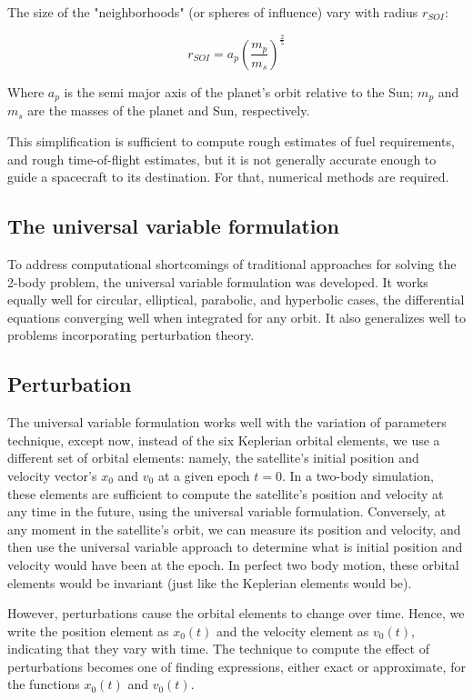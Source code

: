 \documentclass[12pt]{article}
\begin{document}
The size of the "neighborhoods" (or spheres of influence) vary with radius
\(r_{SOI}\):

\[r_{SOI} = a_p{\left(\frac{m_p}{m_s}\right)}^{\frac{2}{5}}\]

Where \(a_p\) is the semi major axis of the planet's orbit relative to the Sun;
\(m_p\) and \(m_s\) are the masses of the planet and Sun, respectively.

This simplification is sufficient to compute rough estimates of fuel
requirements, and rough time-of-flight estimates, but it is not generally
accurate enough to guide a spacecraft to its destination. For that, numerical
methods are required.

\subsection{The universal variable formulation}

To address computational shortcomings of traditional approaches for solving the
2-body problem, the universal variable formulation was developed. It works
equally well for circular, elliptical, parabolic, and hyperbolic cases, the
differential equations converging well when integrated for any orbit. It also
generalizes well to problems incorporating perturbation theory.

\subsection{Perturbation}

The universal variable formulation works well with the variation of parameters
technique, except now, instead of the six Keplerian orbital elements, we use a
different set of orbital elements: namely, the satellite's initial position and
velocity vector's \(x_0\) and \(v_0\) at a given epoch \(t=0\). In a two-body
simulation, these elements are sufficient to compute the satellite's position
and velocity at any time in the future, using the universal variable
formulation. Conversely, at any moment in the satellite's orbit, we can measure
its position and velocity, and then use the universal variable approach to
determine what is initial position and velocity would have been at the epoch.
In perfect two body motion, these orbital elements would be invariant (just
like the Keplerian elements would be).

However, perturbations cause the orbital elements to change over time. Hence,
we write the position element as \(x_0(t)\) and the velocity element as
\(v_0(t)\), indicating that they vary with time. The technique to compute the
effect of perturbations becomes one of finding expressions, either exact or
approximate, for the functions \(x_0(t)\) and \(v_0(t)\).
\end{document}
